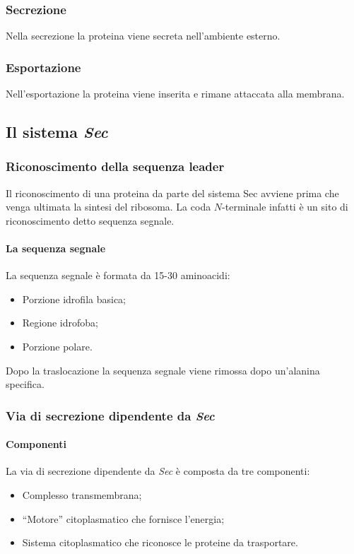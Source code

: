 		\subsubsection{Secrezione}
		Nella secrezione la proteina viene secreta nell'ambiente esterno.

		\subsubsection{Esportazione}
		Nell'esportazione la proteina viene inserita e rimane attaccata alla membrana.

	\subsection{Il sistema \emph{Sec}}

		\subsubsection{Riconoscimento della sequenza leader}
		Il riconoscimento di una proteina da parte del sistema Sec avviene prima che venga ultimata la sintesi del ribosoma. 
		La coda $N$-terminale infatti \`e un sito di riconoscimento detto sequenza segnale.

			\paragraph{La sequenza segnale}
			La sequenza segnale \`e formata da 15-30 aminoacidi:
			\begin{multicols}{2}	
				\begin{itemize}
	 				\item Porzione idrofila basica; 
	    				\item Regione idrofoba; 
	    				\item Porzione polare.
				\end{itemize}
			\end{multicols}
			Dopo la traslocazione la sequenza segnale viene rimossa dopo un'alanina specifica.
	
		\subsubsection{Via di secrezione dipendente da \emph{Sec}}
			
			\paragraph{Componenti}
			La via di secrezione dipendente da \emph{Sec} \`e composta da tre componenti:
			\begin{multicols}{2}
				\begin{itemize}
			    		\item Complesso transmembrana; 
	    				\item ``Motore'' citoplasmatico che fornisce l'energia; 
	    				\item Sistema citoplasmatico che riconosce le proteine da trasportare.
				\end{itemize}
			\end{multicols}

